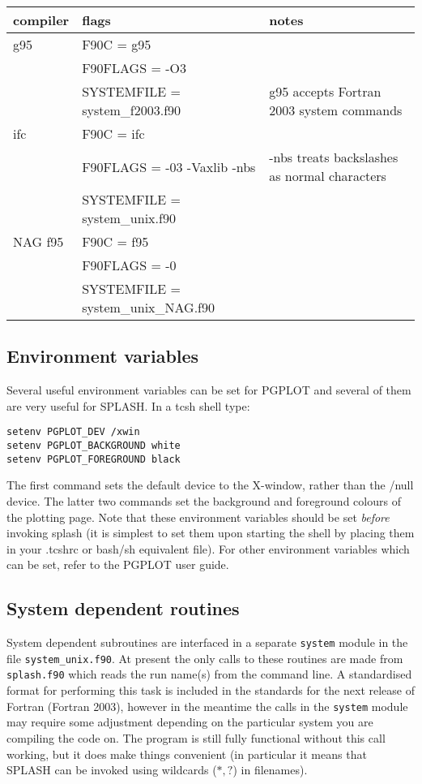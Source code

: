 \documentclass[a4paper,11pt]{article}
\begin{document}
\begin{table}
\begin{center}
\begin{tabular}{|l|l|p{}|}
\hline
compiler & flags & notes \\
\hline
g95 & F90C = g95 & \\
    & F90FLAGS = -O3 & \\ 
    & SYSTEMFILE = system\_f2003.f90 & g95 accepts Fortran 2003 system commands\\
\hline
ifc & F90C = ifc & \\
    & F90FLAGS = -03 -Vaxlib -nbs & -nbs treats backslashes as normal characters\\
    & SYSTEMFILE = system\_unix.f90 & \\
\hline
NAG f95 & F90C = f95 & \\
        & F90FLAGS = -0  & \\
        & SYSTEMFILE = system\_unix\_NAG.f90 & \\
\hline
\end{tabular}
\end{center}
\end{table}
\subsection{Environment variables}
 Several useful environment variables can be set for PGPLOT and several of them
are very useful for SPLASH. In a tcsh shell type:
\begin{verbatim}
setenv PGPLOT_DEV /xwin
setenv PGPLOT_BACKGROUND white
setenv PGPLOT_FOREGROUND black
\end{verbatim}
The first command sets the default device to the X-window, rather than the /null
device. The latter two commands set the background and foreground colours of the
plotting page. Note that these environment variables should be set \emph{before}
invoking splash (it is simplest to set them upon starting the shell by placing
them in your .tcshrc or bash/sh equivalent file). For other environment
variables which can be set, refer to the PGPLOT user guide.

\subsection{System dependent routines}
 System dependent subroutines are interfaced in a separate \verb+system+ module in the file \verb+system_unix.f90+.
At present the only calls to these routines are made from \verb+splash.f90+ which
reads the run name(s) from the command line. A standardised format for performing this
task is included in the standards for the next release of Fortran (Fortran 2003),
however in the meantime the calls in the \verb+system+ module may require some adjustment depending on the
particular system you are compiling the code on. The program is still fully
functional without this call working, but it does make things convenient (in particular it means that
SPLASH can be invoked using wildcards ($*,?$) in filenames).
\end{document}
